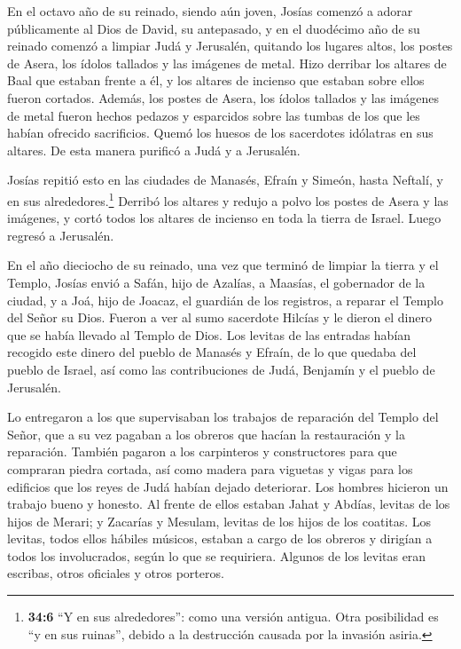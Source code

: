  En el octavo año de su reinado, siendo aún joven, Josías
comenzó a adorar públicamente al Dios de David, su antepasado, y en el
duodécimo año de su reinado comenzó a limpiar Judá y Jerusalén, quitando
los lugares altos, los postes de Asera, los ídolos tallados y las
imágenes de metal.  Hizo derribar los altares de Baal que
estaban frente a él, y los altares de incienso que estaban sobre ellos
fueron cortados. Además, los postes de Asera, los ídolos tallados y las
imágenes de metal fueron hechos pedazos y esparcidos sobre las tumbas de
los que les habían ofrecido sacrificios.  Quemó los huesos
de los sacerdotes idólatras en sus altares. De esta manera purificó a
Judá y a Jerusalén.

 Josías repitió esto en las ciudades de Manasés, Efraín y
Simeón, hasta Neftalí, y en sus alrededores.\footnote{\textbf{34:6} ``Y
  en sus alrededores'': como una versión antigua. Otra posibilidad es
  ``y en sus ruinas'', debido a la destrucción causada por la invasión
  asiria.}  Derribó los altares y redujo a polvo los postes
de Asera y las imágenes, y cortó todos los altares de incienso en toda
la tierra de Israel. Luego regresó a Jerusalén.

 En el año dieciocho de su reinado, una vez que terminó de
limpiar la tierra y el Templo, Josías envió a Safán, hijo de Azalías, a
Maasías, el gobernador de la ciudad, y a Joá, hijo de Joacaz, el
guardián de los registros, a reparar el Templo del Señor su Dios.
 Fueron a ver al sumo sacerdote Hilcías y le dieron el
dinero que se había llevado al Templo de Dios. Los levitas de las
entradas habían recogido este dinero del pueblo de Manasés y Efraín, de
lo que quedaba del pueblo de Israel, así como las contribuciones de
Judá, Benjamín y el pueblo de Jerusalén.

 Lo entregaron a los que supervisaban los trabajos de
reparación del Templo del Señor, que a su vez pagaban a los obreros que
hacían la restauración y la reparación.  También pagaron a
los carpinteros y constructores para que compraran piedra cortada, así
como madera para viguetas y vigas para los edificios que los reyes de
Judá habían dejado deteriorar.  Los hombres hicieron un
trabajo bueno y honesto. Al frente de ellos estaban Jahat y Abdías,
levitas de los hijos de Merari; y Zacarías y Mesulam, levitas de los
hijos de los coatitas. Los levitas, todos ellos hábiles músicos,
 estaban a cargo de los obreros y dirigían a todos los
involucrados, según lo que se requiriera. Algunos de los levitas eran
escribas, otros oficiales y otros porteros.

